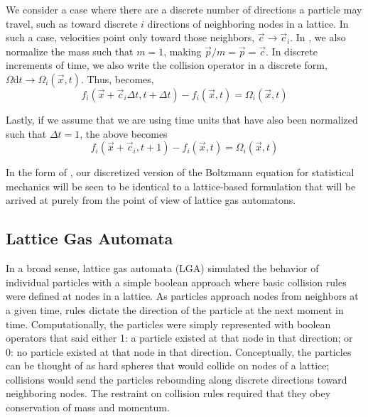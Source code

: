 We consider a case where there are a discrete number of directions a particle may travel, such as toward discrete $i$ directions of neighboring nodes in a lattice. In such a case, velocities point only toward those neighbors, $\vec{c}\rightarrow\vec{c}_i$. In , we also normalize the mass such that $m=1$, making $\vec{p}/m = \vec{p}=\vec{c}$. In discrete increments of time, we also write the collision operator in a discrete form, $\Omega\mathrm{d}t \rightarrow \Omega_i(\vec{x},t)$. Thus,  becomes,
\begin{equation}
	f_i(\vec{x}+\vec{c}_i\Delta t, t + \Delta t) - f_i(\vec{x},t) = \Omega_i(\vec{x},t)
\end{equation}

Lastly, if we assume that we are using time units that have also been normalized such that $\Delta t = 1$, the above becomes
\begin{equation}\label{eq:boltzmann2lbe}
	f_i(\vec{x}+\vec{c}_i, t + 1) - f_i(\vec{x},t) = \Omega_i(\vec{x},t)
\end{equation}

In the form of , our discretized version of the Boltzmann equation for statistical mechanics will be seen to be identical to a lattice-based formulation that will be arrived at purely from the point of view of lattice gas automatons.



\subsection{Lattice Gas Automata}

In a broad sense, lattice gas automata (LGA) simulated the behavior of individual particles with a simple boolean approach where basic collision rules were defined at nodes in a lattice. As particles approach nodes from neighbors at a given time, rules dictate the direction of the particle at the next moment in time. Computationally, the particles were simply represented with boolean operators that said either 1: a particle existed at that node in that direction; or 0: no particle existed at that node in that direction. Conceptually, the particles can be thought of as hard spheres that would collide on nodes of a lattice; collisions would send the particles rebounding along discrete directions toward neighboring nodes. The restraint on collision rules required that they obey conservation of mass and momentum. 

